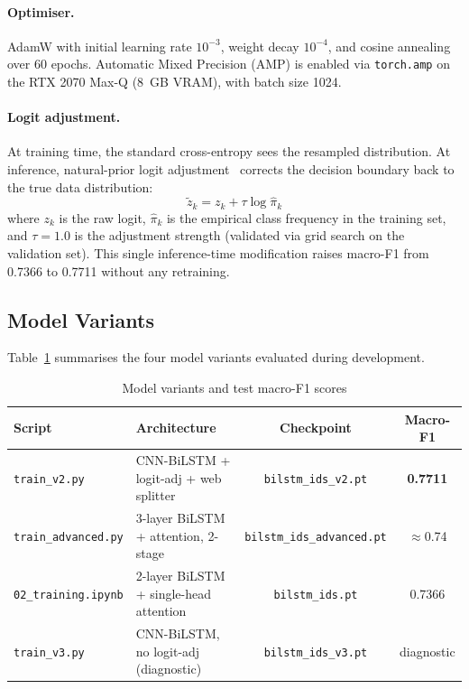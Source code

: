 \documentclass[12pt]{article}
\theoremstyle{plain}
\begin{document}
\paragraph{Optimiser.}
AdamW with initial learning rate $10^{-3}$, weight decay $10^{-4}$, and cosine annealing over 60 epochs. Automatic Mixed Precision (AMP) is enabled via \texttt{torch.amp} on the RTX 2070 Max-Q (8~GB VRAM), with batch size 1024.

\paragraph{Logit adjustment.}
At training time, the standard cross-entropy sees the resampled distribution. At inference, natural-prior logit adjustment~\cite{logit_adjustment} corrects the decision boundary back to the true data distribution:
\begin{equation}
\tilde{z}_k = z_k + \tau \log \hat{\pi}_k
\label{eq:la}
\end{equation}
where $z_k$ is the raw logit, $\hat{\pi}_k$ is the empirical class frequency in the training set, and $\tau = 1.0$ is the adjustment strength (validated via grid search on the validation set). This single inference-time modification raises macro-F1 from 0.7366 to 0.7711 without any retraining.

\subsection{Model Variants}

Table~\ref{tab:models} summarises the four model variants evaluated during development.

\begin{table}[H]
\centering
\caption{Model variants and test macro-F1 scores}
\label{tab:models}
\renewcommand{\arraystretch}{1.2}
\begin{tabular}{llcc}
\toprule
\rowcolor{lightblue}
\textbf{Script} & \textbf{Architecture} & \textbf{Checkpoint} & \textbf{Macro-F1} \\
\midrule
\texttt{train\_v2.py}       & CNN-BiLSTM + logit-adj + web splitter & \texttt{bilstm\_ids\_v2.pt}       & \textbf{0.7711} \\
\texttt{train\_advanced.py} & 3-layer BiLSTM + attention, 2-stage   & \texttt{bilstm\_ids\_advanced.pt} & $\approx$0.74   \\
\texttt{02\_training.ipynb} & 2-layer BiLSTM + single-head attention & \texttt{bilstm\_ids.pt}           & 0.7366          \\
\texttt{train\_v3.py}       & CNN-BiLSTM, no logit-adj (diagnostic)  & \texttt{bilstm\_ids\_v3.pt}       & diagnostic      \\
\bottomrule
\end{tabular}
\end{table}
\end{document}
